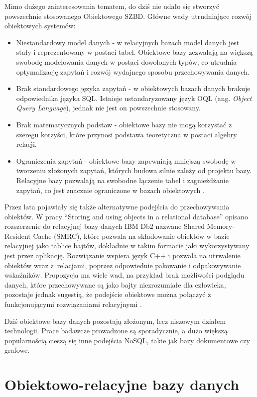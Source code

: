 \documentclass[a4paper,twoside,12pt]{book}
\begin{document}
Mimo dużego zainteresowania tematem, do dziś nie udało się stworzyć powszechnie stosowanego Obiektowego SZBD. Główne wady utrudniające rozwój obiektowych systemów:
\begin{itemize}
    \item Niestandardowy model danych - w relacyjnych bazach model danych jest stały i reprezentowany w postaci tabel. Obiektowe bazy zezwalają na większą swobodę modelowania danych w postaci dowolonych typów, co utrudnia optymalizację zapytań i rozwój wydajnego sposobu przechowywania danych.
    \item Brak standardowego języka zapytań - w obiektowych bazach danych brakuje odpowiednika języka SQL. Istnieje ustandaryzowany język OQL (ang. \textit{Object Query Language}), jednak nie jest on powszechnie stosowany.
    \item Brak matematycznych podstaw - obiektowe bazy nie mogą korzystać z szeregu korzyści, które przynosi podstawa teoretyczna w postaci algebry relacji.
    \item Ograniczenia zapytań - obiektowe bazy zapewniają mniejszą swobodę w tworzeniu złożonych zapytań, których budowa silnie zależy od projektu bazy. Relacyjne bazy pozwalają na swobodne łączenie tabel i zagnieżdżanie zapytań, co jest znacznie ograniczone w bazach obiektowych \cite{bib:evolution-odbs}.
\end{itemize}

Przez lata pojawiały się także alternatywne podejścia do przechowywania obiektów. W pracy ``Storing and using objects in a relational database'' opisano rozszerzenie do relacyjnej bazy danych IBM Db2 nazwane Shared Memory-Resident Cache (SMRC), które pozwala na składowanie obiektów w bazie relacyjnej jako tablice bajtów, dokładnie w takim formacie jaki wykorzystywany jest przez aplikację. Rozwiązanie wspiera język C++ i pozwala na utrwalenie obiektów wraz z~relacjami, poprzez odpowiednie pakowanie i odpakowywanie wskaźników. Propozycja ma wiele wad, na przykład brak możliwości podglądu danych, które przechowywane są jako bajty niezrozumiałe dla człowieka, pozostaje jednak sugestią, że podejście obiektowe można połączyć z funkcjonującymi rozwiązaniami relacyjnymi \cite{bib:storing-and-using-objects}.

Dziś obiektowe bazy danych pozostają złożonym, lecz niszowym działem technologii. Prace badawcze prowadzone są sporadycznie, a dużo większą popularnością cieszą się inne podejścia NoSQL, takie jak bazy dokumentowe czy grafowe.

\section{Obiektowo-relacyjne bazy danych}
\end{document}
